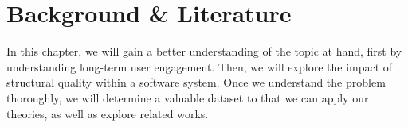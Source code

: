 \chapter{Background \& Literature} \label{chapterBackground}





In this chapter, we will gain a better understanding of the topic at hand, first by understanding long-term user engagement. Then, we will explore the impact of structural quality within a software system. Once we understand the problem thoroughly, we will determine a valuable dataset to that we can apply our theories, as well as explore related works.
